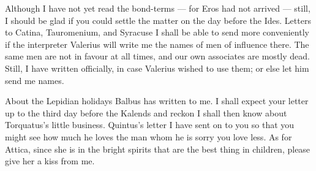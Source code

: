  Although I have not yet read the bond-terms --- for Eros had not arrived --- still, I should be glad if you could settle the matter on the day before the Ides. Letters to Catina, Tauromenium, and Syracuse I shall be able to send more conveniently if the interpreter Valerius will write me the names of men of influence there. The same men are not in favour at all times, and our own associates are mostly dead. Still, I have written officially, in case Valerius wished to use them; or else let him send me names.

 About the Lepidian holidays Balbus has written to me. I shall expect your letter up to the third day before the Kalends and reckon I shall then know about Torquatus's little business. Quintus's letter I have sent on to you so that you might see how much he loves the man whom he is sorry you love less. As for Attica, since she is in the bright spirits that are the best thing in children, please give her a kiss from me.

